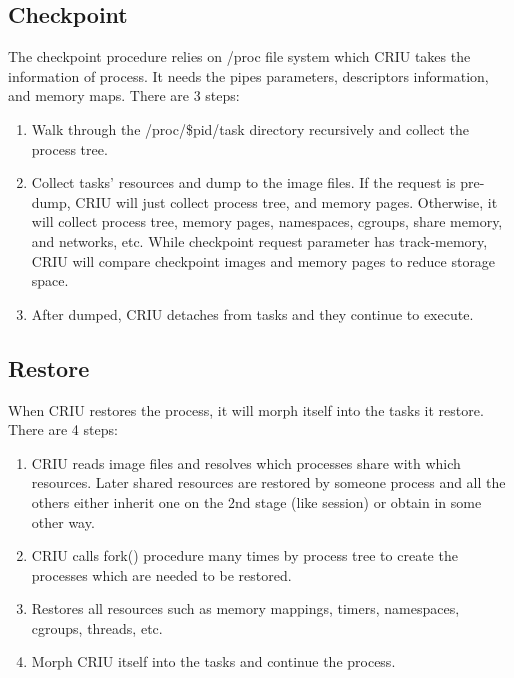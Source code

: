\subsection{Checkpoint}
The checkpoint procedure relies on /proc file system which CRIU takes the information of process.  It needs the pipes parameters, descriptors information, and memory maps. There are 3 steps:
\begin{enumerate}[Step 1.]
	\item Walk through the /proc/\$pid/task directory recursively and collect the process tree.
    \item Collect tasks' resources and dump to the image files.  If the request is pre-dump, CRIU will just collect process tree, and memory pages.  Otherwise, it will collect process tree, memory pages, namespaces, cgroups, share memory, and networks, etc.  While checkpoint request parameter has track-memory, CRIU will compare checkpoint images and memory pages to reduce storage space.
    \item After dumped, CRIU detaches from tasks and they continue to
execute.
\end{enumerate}

\subsection{Restore}
When CRIU restores the process, it will morph itself into the tasks it restore.   There are 4 steps:
\begin{enumerate}[Step 1.]
	\item CRIU reads image files and resolves which processes share with which resources.  Later shared resources are restored by someone process and all the others either inherit one on the 2nd stage (like session) or obtain in some other way.
    \item CRIU calls fork() procedure many times by process tree to create the processes which are needed to be restored.
    \item Restores all resources such as memory mappings, timers, namespaces, cgroups, threads, etc.
    \item Morph CRIU itself into the tasks and continue the process.
\end{enumerate}
